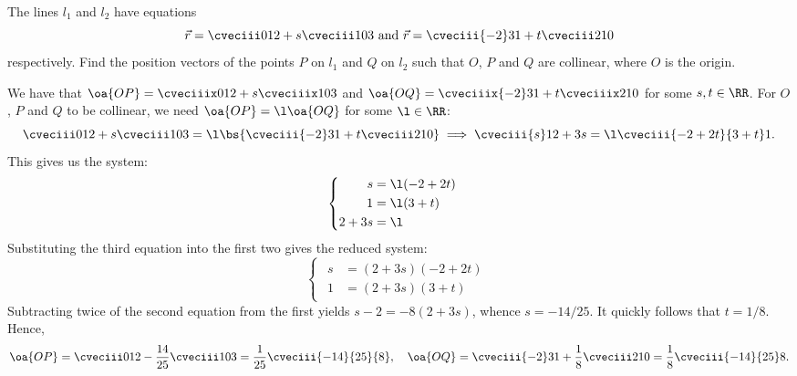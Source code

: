 \begin{problem}
    The lines $l_1$ and $l_2$ have equations \[\vec r = \cveciii012 + s\cveciii103 \text{ and } \vec r = \cveciii{-2}31 + t\cveciii210\] respectively. Find the position vectors of the points $P$ on $l_1$ and $Q$ on $l_2$ such that $O$, $P$ and $Q$ are collinear, where $O$ is the origin.
\end{problem}
\begin{solution}
    We have that $\oa{OP} = \cveciiix012 + s\cveciiix103$ and $\oa{OQ} = \cveciiix{-2}31 + t\cveciiix210$ for some $s, t \in \RR$. For $O$, $P$ and $Q$ to be collinear, we need $\oa{OP} = \l \oa{OQ}$ for some $\l \in \RR$: \[\cveciii012 + s\cveciii103 = \l\bs{\cveciii{-2}31 + t\cveciii210} \implies \cveciii{s}1{2 + 3s} = \l\cveciii{-2+2t}{3+t}1.\] This gives us the system: \[\begin{cases}
        \begin{aligned}
            s &= \l (-2 + 2t)\\
            1 &= \l(3 + t)\\
            2 + 3s &= \l 
        \end{aligned}
    \end{cases}\] Substituting the third equation into the first two gives the reduced system: \[\begin{cases}
        \begin{aligned}
            s &= (2+3s)(-2+2t)\\
            1 &= (2+3s)(3+t)
        \end{aligned}
    \end{cases}\] Subtracting twice of the second equation from the first yields $s-2 = -8(2+3s)$, whence $s = -14/25$. It quickly follows that $t = 1/8$. Hence, \[\oa{OP} = \cveciii012 - \frac{14}{25}\cveciii103 = \frac1{25}\cveciii{-14}{25}{8}, \quad \oa{OQ} = \cveciii{-2}31 + \frac18\cveciii210 = \frac18 \cveciii{-14}{25}8.\]
\end{solution}

